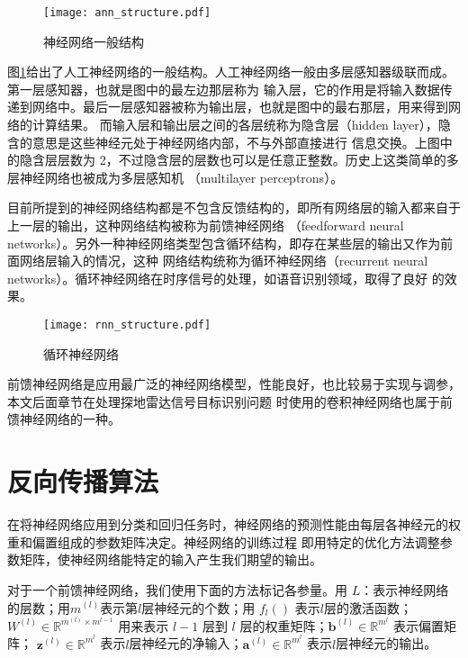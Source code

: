 \begin{figure}[htbp]
	\texttt{[image: ann\_structure.pdf]}
	\caption{神经网络一般结构}
	\label{ann_structure}
\end{figure}

图\ref{ann_structure}给出了人工神经网络的一般结构。人工神经网络一般由多层感知器级联而成。第一层感知器，也就是图中的最左边那层称为
输入层，它的作用是将输入数据传递到网络中。最后一层感知器被称为输出层，也就是图中的最右那层，用来得到网络的计算结果。
而输入层和输出层之间的各层统称为隐含层（hidden layer），隐含的意思是这些神经元处于神经网络内部，不与外部直接进行
信息交换。上图中的隐含层层数为 2，不过隐含层的层数也可以是任意正整数。历史上这类简单的多层神经网络也被成为多层感知机
（multilayer perceptrons）。

目前所提到的神经网络结构都是不包含反馈结构的，即所有网络层的输入都来自于上一层的输出，这种网络结构被称为前馈神经网络
（feedforward neural networks）。另外一种神经网络类型包含循环结构，即存在某些层的输出又作为前面网络层输入的情况，这种
网络结构统称为循环神经网络（recurrent neural networks）。循环神经网络在时序信号的处理，如语音识别领域，取得了良好
的效果。

\begin{figure}[htbp]
	\texttt{[image: rnn\_structure.pdf]}
	\caption{循环神经网络}
	\label{rnn_structure}
\end{figure}

前馈神经网络是应用最广泛的神经网络模型，性能良好，也比较易于实现与调参，本文后面章节在处理探地雷达信号目标识别问题
时使用的卷积神经网络也属于前馈神经网络的一种。

\section{反向传播算法}
在将神经网络应用到分类和回归任务时，神经网络的预测性能由每层各神经元的权重和偏置组成的参数矩阵决定。神经网络的训练过程
即用特定的优化方法调整参数矩阵，使神经网络能特定的输入产生我们期望的输出。

对于一个前馈神经网络，我们使用下面的方法标记各参量。用 $L$：表示神经网络的层数；用$m^{(l)}$表示第$l$层神经元的个数；用
$f_l ()$ 表示$l$层的激活函数；$W ^ { ( l ) } \in \mathbb { R } ^ { m ^ { ( l ) } \times m ^ { l - 1 } }$ 用来表示
$l-1$ 层到 $l$ 层的权重矩阵；$\mathbf { b } ^ { ( l ) } \in \mathbb { R } ^ { m ^ { l } }$ 表示偏置矩阵；
$\mathbf { z } ^ { ( l ) } \in \mathbb { R } ^ { m ^ { l } }$ 表示$l$层神经元的净输入；$\mathbf { a } ^ { ( l ) } \in \mathbb { R } ^ { m ^ { l } }$
表示$l$层神经元的输出。

